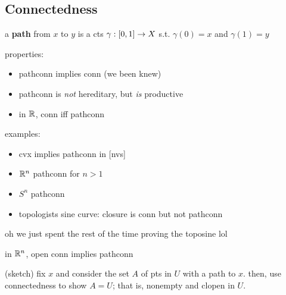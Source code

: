 \subsection{Connectedness}

\begin{defn}
    a \textbf{path} from $x$ to $y$ is a cts $\gamma:[0,1]\rightarrow X$ s.t.
    $\gamma(0)=x$ and $\gamma(1)=y$
\end{defn}
properties:
\begin{itemize}[topsep=-0.75ex]
    \item pathconn implies conn (we been knew)
    \item pathconn is \textit{not} hereditary, but \textit{is} productive
    \item in $\mathbb{R}$, conn iff pathconn
\end{itemize}
examples:
\begin{itemize}[topsep=-0.75ex]
    \item cvx implies pathconn in [nvs]
    \item $\mathbb{R}^{n}$ pathconn for $n>1$
    \item $S^{n}$ pathconn
    \item topologists sine curve: closure is conn but not pathconn
\end{itemize}
oh we just spent the rest of the time proving the toposine lol

\begin{prop}
    in $\mathbb{R}^{n}$, open conn implies pathconn
\end{prop}

\begin{pf}[source=Primary Source Material]
    (sketch) fix $x$ and consider the set $A$ of pts in $U$ with a path to $x$.
    then, use connectedness to show $A=U$; that is, nonempty and clopen in $U$.
\end{pf}
